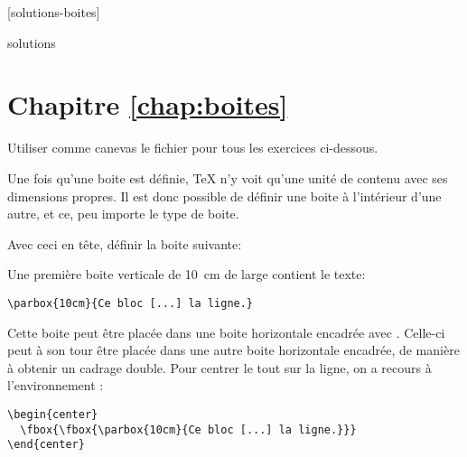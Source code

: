 [solutions-boites]

\begin{Filesave}{solutions}
\section*{Chapitre \ref*{chap:boites}}

\end{Filesave}

\noindent%
Utiliser comme canevas le fichier  pour
tous les exercices ci-dessous.

\begin{exercice}
  Une fois qu'une boite est définie, {\TeX} n'y voit qu'une unité de
  contenu avec ses dimensions propres. Il est donc possible de définir
  une boite à l'intérieur d'une autre, et ce, peu importe le type de
  boite.

  Avec ceci en tête, définir la boite suivante:
  \begin{center}
  \end{center}

  \begin{sol}
    Une première boite verticale de 10~cm de large contient le texte:
\begin{lstlisting}
\parbox{10cm}{Ce bloc [...] la ligne.}
\end{lstlisting}
    Cette boite peut être placée dans une boite horizontale encadrée
    avec \cmd{\fbox}. Celle-ci peut à son tour être placée dans une autre
    boite horizontale encadrée, de manière à obtenir un cadrage
    double. Pour centrer le tout sur la ligne, on a recours à
    l'environnement :
\begin{lstlisting}
\begin{center}
  \fbox{\fbox{\parbox{10cm}{Ce bloc [...] la ligne.}}}
\end{center}
\end{lstlisting}
  \end{sol}
\end{exercice}

